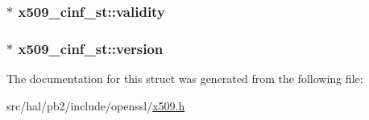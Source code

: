 \subsubsection[{\texorpdfstring{validity}{validity}}]{$\ast$ x509\+\_\+cinf\+\_\+st\+::validity}\hypertarget{structx509__cinf__st_ac808f4c20ecdf9bfae8656d205e8add1}{}\label{structx509__cinf__st_ac808f4c20ecdf9bfae8656d205e8add1}
\subsubsection[{\texorpdfstring{version}{version}}]{$\ast$ x509\+\_\+cinf\+\_\+st\+::version}\hypertarget{structx509__cinf__st_a6376a52ce4df3f461bc4f16c27a38c64}{}\label{structx509__cinf__st_a6376a52ce4df3f461bc4f16c27a38c64}


The documentation for this struct was generated from the following file\+:\begin{DoxyCompactItemize}
\item 
src/hal/pb2/include/openssl/\hyperlink{x509_8h}{x509.\+h}\end{DoxyCompactItemize}

